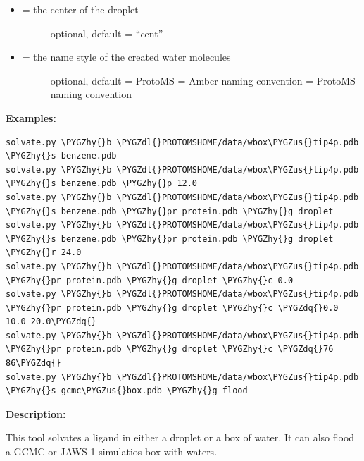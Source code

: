 \documentclass[letterpaper,10pt,english]{sphinxmanual}
\def\PYGZus{\char`\_}
\def\PYGZdl{\char`\$}
\def\PYGZhy{\char`\-}
\def\PYGZdq{\char`\"}
\begin{document}
\begin{itemize}
\begin{description}
\end{description}

\item {} \begin{description}
\item[{ = the center of the droplet}] \leavevmode
optional, default = ``cent''

\end{description}

\item {} \begin{description}
\item[{ = the name style of the created water molecules}] \leavevmode
optional, default = ProtoMS
 = Amber naming convention
 = ProtoMS naming convention

\end{description}

\end{itemize}

\textbf{Examples:}

\begin{Verbatim}[commandchars=\\\{\}]
solvate.py \PYGZhy{}b \PYGZdl{}PROTOMSHOME/data/wbox\PYGZus{}tip4p.pdb \PYGZhy{}s benzene.pdb
solvate.py \PYGZhy{}b \PYGZdl{}PROTOMSHOME/data/wbox\PYGZus{}tip4p.pdb \PYGZhy{}s benzene.pdb \PYGZhy{}p 12.0
solvate.py \PYGZhy{}b \PYGZdl{}PROTOMSHOME/data/wbox\PYGZus{}tip4p.pdb \PYGZhy{}s benzene.pdb \PYGZhy{}pr protein.pdb \PYGZhy{}g droplet
solvate.py \PYGZhy{}b \PYGZdl{}PROTOMSHOME/data/wbox\PYGZus{}tip4p.pdb \PYGZhy{}s benzene.pdb \PYGZhy{}pr protein.pdb \PYGZhy{}g droplet \PYGZhy{}r 24.0
solvate.py \PYGZhy{}b \PYGZdl{}PROTOMSHOME/data/wbox\PYGZus{}tip4p.pdb \PYGZhy{}pr protein.pdb \PYGZhy{}g droplet \PYGZhy{}c 0.0
solvate.py \PYGZhy{}b \PYGZdl{}PROTOMSHOME/data/wbox\PYGZus{}tip4p.pdb \PYGZhy{}pr protein.pdb \PYGZhy{}g droplet \PYGZhy{}c \PYGZdq{}0.0 10.0 20.0\PYGZdq{}
solvate.py \PYGZhy{}b \PYGZdl{}PROTOMSHOME/data/wbox\PYGZus{}tip4p.pdb \PYGZhy{}pr protein.pdb \PYGZhy{}g droplet \PYGZhy{}c \PYGZdq{}76 86\PYGZdq{}
solvate.py \PYGZhy{}b \PYGZdl{}PROTOMSHOME/data/wbox\PYGZus{}tip4p.pdb \PYGZhy{}s gcmc\PYGZus{}box.pdb \PYGZhy{}g flood
\end{Verbatim}

\textbf{Description:}

This tool solvates a ligand in either a droplet or a box of water. It can also flood a GCMC or JAWS-1 simulatios box with waters.
\end{document}

